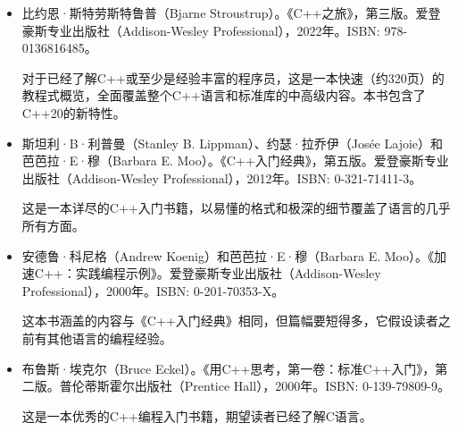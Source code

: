 \begin{itemize}
\item
比约恩·斯特劳斯特鲁普（Bjarne Stroustrup）。《C++之旅》，第三版。爱登豪斯专业出版社（Addison-Wesley Professional），2022年。ISBN: 978-0136816485。

\hspace*{\fill}

对于已经了解C++或至少是经验丰富的程序员，这是一本快速（约320页）的教程式概览，全面覆盖整个C++语言和标准库的中高级内容。本书包含了C++20的新特性。

\hspace*{\fill}

\item
斯坦利·B·利普曼（Stanley B. Lippman）、约瑟·拉乔伊（Josée Lajoie）和芭芭拉·E·穆（Barbara E. Moo）。《C++入门经典》，第五版。爱登豪斯专业出版社（Addison-Wesley Professional），2012年。ISBN: 0-321-71411-3。

\hspace*{\fill}

这是一本详尽的C++入门书籍，以易懂的格式和极深的细节覆盖了语言的几乎所有方面。

\hspace*{\fill}

\item
安德鲁·科尼格（Andrew Koenig）和芭芭拉·E·穆（Barbara E. Moo）。《加速C++：实践编程示例》。爱登豪斯专业出版社（Addison-Wesley Professional），2000年。ISBN: 0-201-70353-X。

\hspace*{\fill}

这本书涵盖的内容与《C++入门经典》相同，但篇幅要短得多，它假设读者之前有其他语言的编程经验。

\hspace*{\fill}

\item
布鲁斯·埃克尔（Bruce Eckel）。《用C++思考，第一卷：标准C++入门》，第二版。普伦蒂斯霍尔出版社（Prentice Hall），2000年。ISBN: 0-139-79809-9。

\hspace*{\fill}

这是一本优秀的C++编程入门书籍，期望读者已经了解C语言。
\end{itemize}


